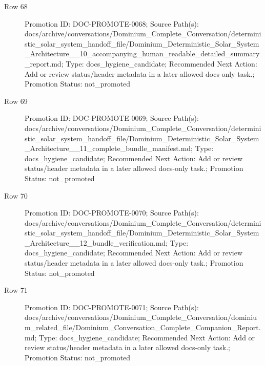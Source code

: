 \documentclass[9pt,a4paper,openany]{book}
\begin{document}
\begin{description}
\item[Row 68] Promotion ID: DOC-\allowbreak{}PROMOTE-\allowbreak{}0068; Source Path(s): docs/\allowbreak{}archive/\allowbreak{}conversations/\allowbreak{}Dominium\_\allowbreak{}Complete\_\allowbreak{}Conversation/\allowbreak{}deterministic\_\allowbreak{}solar\_\allowbreak{}system\_\allowbreak{}handoff\_\allowbreak{}file/\allowbreak{}Dominium\_\allowbreak{}Deterministic\_\allowbreak{}Solar\_\allowbreak{}System\_\allowbreak{}Architecture\_\allowbreak{}\_\allowbreak{}10\_\allowbreak{}accompanying\_\allowbreak{}human\_\allowbreak{}readable\_\allowbreak{}detailed\_\allowbreak{}summary\_\allowbreak{}report.\allowbreak{}md; Type: docs\_\allowbreak{}hygiene\_\allowbreak{}candidate; Recommended Next Action: Add or review status/\allowbreak{}header metadata in a later allowed docs-\allowbreak{}only task.\allowbreak{}; Promotion Status: not\_\allowbreak{}promoted
\item[Row 69] Promotion ID: DOC-\allowbreak{}PROMOTE-\allowbreak{}0069; Source Path(s): docs/\allowbreak{}archive/\allowbreak{}conversations/\allowbreak{}Dominium\_\allowbreak{}Complete\_\allowbreak{}Conversation/\allowbreak{}deterministic\_\allowbreak{}solar\_\allowbreak{}system\_\allowbreak{}handoff\_\allowbreak{}file/\allowbreak{}Dominium\_\allowbreak{}Deterministic\_\allowbreak{}Solar\_\allowbreak{}System\_\allowbreak{}Architecture\_\allowbreak{}\_\allowbreak{}11\_\allowbreak{}complete\_\allowbreak{}bundle\_\allowbreak{}manifest.\allowbreak{}md; Type: docs\_\allowbreak{}hygiene\_\allowbreak{}candidate; Recommended Next Action: Add or review status/\allowbreak{}header metadata in a later allowed docs-\allowbreak{}only task.\allowbreak{}; Promotion Status: not\_\allowbreak{}promoted
\item[Row 70] Promotion ID: DOC-\allowbreak{}PROMOTE-\allowbreak{}0070; Source Path(s): docs/\allowbreak{}archive/\allowbreak{}conversations/\allowbreak{}Dominium\_\allowbreak{}Complete\_\allowbreak{}Conversation/\allowbreak{}deterministic\_\allowbreak{}solar\_\allowbreak{}system\_\allowbreak{}handoff\_\allowbreak{}file/\allowbreak{}Dominium\_\allowbreak{}Deterministic\_\allowbreak{}Solar\_\allowbreak{}System\_\allowbreak{}Architecture\_\allowbreak{}\_\allowbreak{}12\_\allowbreak{}bundle\_\allowbreak{}verification.\allowbreak{}md; Type: docs\_\allowbreak{}hygiene\_\allowbreak{}candidate; Recommended Next Action: Add or review status/\allowbreak{}header metadata in a later allowed docs-\allowbreak{}only task.\allowbreak{}; Promotion Status: not\_\allowbreak{}promoted
\item[Row 71] Promotion ID: DOC-\allowbreak{}PROMOTE-\allowbreak{}0071; Source Path(s): docs/\allowbreak{}archive/\allowbreak{}conversations/\allowbreak{}Dominium\_\allowbreak{}Complete\_\allowbreak{}Conversation/\allowbreak{}dominium\_\allowbreak{}related\_\allowbreak{}file/\allowbreak{}Dominium\_\allowbreak{}Conversation\_\allowbreak{}Complete\_\allowbreak{}Companion\_\allowbreak{}Report.\allowbreak{}md; Type: docs\_\allowbreak{}hygiene\_\allowbreak{}candidate; Recommended Next Action: Add or review status/\allowbreak{}header metadata in a later allowed docs-\allowbreak{}only task.\allowbreak{}; Promotion Status: not\_\allowbreak{}promoted

\end{description}
\end{document}
